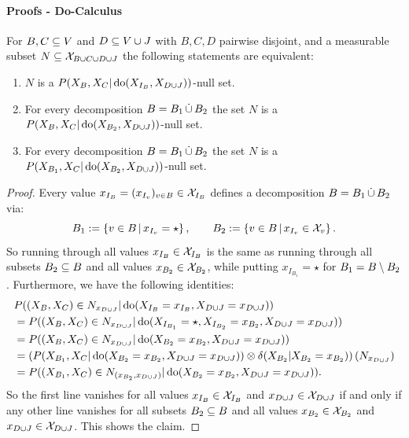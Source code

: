 \paragraph{Proofs - Do-Calculus}\hfill%


\begin{Lem}\label{lem:int-null-set}
    For $B,C \subseteq V$ and $D \subseteq V \cup J$ with $B,C,D$ pairwise disjoint, and a measurable subset $N \subseteq \mathcal{X}_{B \cup C\cup D \cup J}$ the following statements are equivalent:
    \begin{enumerate}
        \item $N$ is a $P(X_B,X_C|\operatorname{do}(X_{I_B},X_{D\cup J}))$-null set.
        \item For every decomposition $B=B_1 \,\dot{\cup}\, B_2$ the set $N$ is a 
            $P(X_B,X_C|\operatorname{do}(X_{B_2},X_{D\cup J}))$-null set.
        \item For every decomposition $B=B_1 \,\dot{\cup}\, B_2$ the set $N$ is a 
            $P(X_{B_1},X_C|\operatorname{do}(X_{B_2},X_{D\cup J}))$-null set.
    \end{enumerate}
\begin{proof}
    Every value $x_{I_B}=(x_{I_v})_{v \in B} \in \mathcal{X}_{I_B}$ defines a decomposition $B=B_1 \,\dot{\cup}\, B_2$ via:
    \[ B_1 := \left \{ v \in B \,\middle|\, x_{I_v} = \star \right \}, \qquad B_2 := \left \{ v \in B \,\middle|\, x_{I_v} \in \mathcal{X}_v \right \}.  \]
    So running through all values $x_{I_B} \in \mathcal{X}_{I_B}$ is the same as running through all subsets $B_2 \subseteq B$ and all values $x_{B_2} \in \mathcal{X}_{B_2}$, while putting $x_{I_{B_1}}=\star$ for $B_1 = B \setminus B_2$.
    Furthermore, we have the following identities:
    \begin{align*}
          &   P((X_B,X_C) \in N_{x_{D\cup J}}|\operatorname{do}(X_{I_B}=x_{I_B},X_{D\cup J}=x_{D\cup J})) \\
        &=   P((X_B,X_C) \in N_{x_{D\cup J}}|\operatorname{do}(X_{I_{B_1}} = \star ,X_{I_{B_2}}=x_{B_2},X_{D\cup J}=x_{D\cup J})) \\
     &=   P((X_B,X_C) \in N_{x_{D\cup J}}|\operatorname{do}(X_{B_2}=x_{B_2},X_{D\cup J}=x_{D\cup J})) \\
     &= \left ( P(X_{B_1},X_C|\operatorname{do}(X_{B_2}=x_{B_2},X_{D\cup J}=x_{D\cup J})) \otimes \delta(X_{B_2}|X_{B_2}=x_{B_2})\right )\left ( N_{x_{D\cup J}} \right ) \\
     &= P((X_{B_1},X_C) \in N_{(x_{B_2},x_{D\cup J})}|\operatorname{do}(X_{B_2}=x_{B_2},X_{D\cup J}=x_{D\cup J})).
    \end{align*}
    So the first line vanishes for all values $x_{I_B} \in \mathcal{X}_{I_B}$ and $x_{D\cup J} \in \mathcal{X}_{D\cup J}$ if and only if any other line vanishes
    for all subsets $B_2 \subseteq B$ and all values $x_{B_2} \in \mathcal{X}_{B_2}$ and $x_{D\cup J} \in \mathcal{X}_{D\cup J}$.
    This shows the claim.
\end{proof}
\end{Lem}

